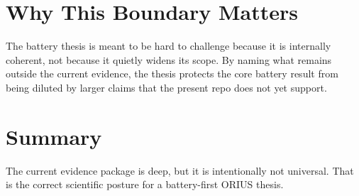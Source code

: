 \section{Why This Boundary Matters}

The battery thesis is meant to be hard to challenge because it is internally
coherent, not because it quietly widens its scope.  By naming what remains
outside the current evidence, the thesis protects the core battery result from
being diluted by larger claims that the present repo does not yet support.

\section{Summary}

The current evidence package is deep, but it is intentionally not universal.
That is the correct scientific posture for a battery-first ORIUS thesis.

